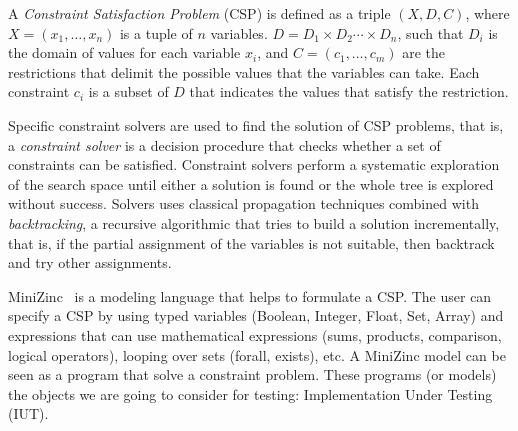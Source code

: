 \begin{definition}
  A \textit{Constraint Satisfaction Problem}
  \citep{guns2017miningzinc} (CSP) is defined as a triple
  $( X, D, C)$, where $X=(x_{1},\dots ,x_{n})$ is a tuple of $n$
  variables.  $D=D_{1}\times D_{2}\cdots \times D_{n}$, such that
  $D_i$ is the domain of values for each variable $x_i$, and
  $C=(c_{1},\dots ,c_{m})$ are the restrictions that delimit the
  possible values that the variables can take.  Each constraint
  $c_{i}$ is a subset of $D$ that indicates the values that satisfy
  the restriction.
\end{definition}



Specific constraint solvers are used to find the solution of CSP problems, that is, a \textit{constraint solver} is a decision procedure that checks whether a set of constraints can be satisfied.
Constraint solvers perform a systematic exploration of the search space until either a solution is found or the whole tree is explored without success.
Solvers uses classical propagation techniques \citep{van89} combined with {\em backtracking},
a recursive algorithmic that tries to build a solution incrementally, that is, if the partial assignment of the variables is not suitable, then backtrack and try other assignments.


MiniZinc~\cite{DBLP:journals/constraints/MarriottNRSBW08} is a modeling
language that helps to formulate a CSP. The user can specify a CSP by
using typed variables (Boolean, Integer, Float, Set, Array) and
expressions that can use mathematical expressions (sums, products,
comparison, logical operators), looping over sets (forall, exists), etc.
A MiniZinc model can be seen as a program that solve a constraint
problem. These programs (or models) the objects we are going to
consider for testing: Implementation Under Testing (IUT).

